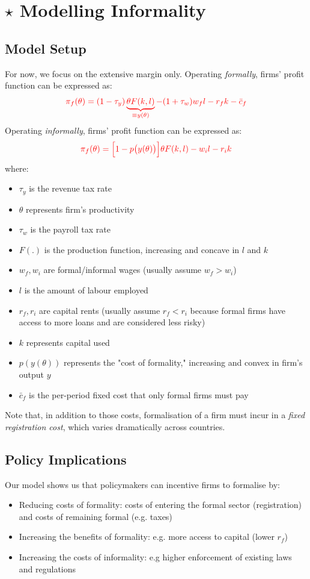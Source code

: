 \section{$\star$ Modelling Informality}
    \subsection{Model Setup}
        For now, we focus on the extensive margin only.
        Operating \emph{formally}, firms' profit function can be expressed as:
        $$\color{red} \pi_f(\theta) = (1-\tau_y)\underbrace{\theta F(k,l)}_{\equiv y(\theta)} - (1+\tau_w)w_fl -r_f k - \bar{c}_f$$
        Operating \emph{informally}, firms' profit function can be expressed as:
        $$\color{red} \pi_f(\theta) = \Big[1-p\big(y(\theta)\big)\Big]\theta F(k,l) - w_il -r_ik$$
        where:
        \begin{itemize}
            \item $\tau_y$ is the revenue tax rate
            \item $\theta$ represents firm's productivity
            \item $\tau_w$ is the payroll tax rate
            \item $F(.)$ is the production function, increasing and concave in $l$ and $k$
            \item $w_f, w_i$ are formal/informal wages (usually assume $w_f>w_i$)
            \item $l$ is the amount of labour employed
            \item $r_f, r_i$ are capital rents (usually assume $r_f<r_i$ because formal firms have access to more loans and are considered less risky)
            \item $k$ represents capital used
            \item $p(y(\theta))$ represents the "cost of formality," increasing and convex in firm's output $y$
            \item $\bar{c}_f$ is the per-period fixed cost that only formal firms must pay
        \end{itemize}
        Note that, in addition to those costs, formalisation of a firm must incur in a \emph{fixed registration cost}, which varies dramatically across countries.
    
    \subsection{Policy Implications}
        Our model shows us that policymakers can incentive firms to formalise by:
        \begin{itemize}
            \item Reducing costs of formality: costs of entering the formal sector (registration) and costs of remaining formal (e.g. taxes)
            \item Increasing the benefits of formality: e.g. more access to capital (lower $r_f$)
            \item Increasing the costs of informality: e.g higher enforcement of existing laws and regulations
        \end{itemize}
        
